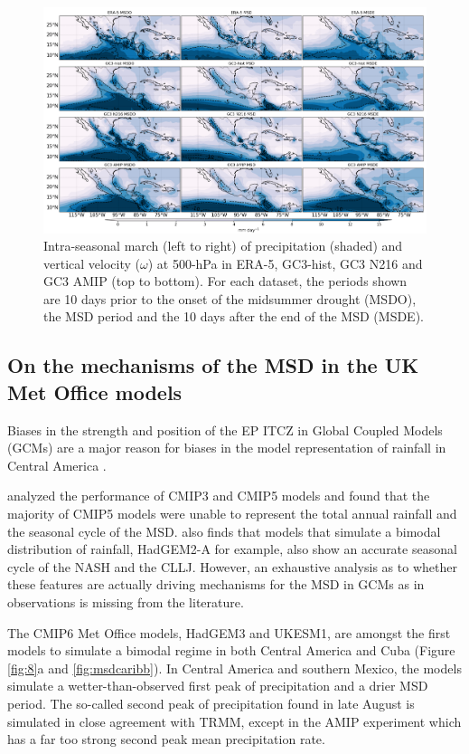   \begin{figure}[t!]
\includegraphics[width=\linewidth]{figures/modcompar_dif2pr3.png}
\caption{Intra-seasonal march (left to right) of precipitation (shaded) and vertical velocity ($\omega$) at 500-hPa in ERA-5, GC3-hist, GC3 N216 and GC3 AMIP (top to bottom). For each dataset, the periods shown are 10 days prior to the onset of the midsummer drought (MSDO), the MSD period and the 10 days after the end of the MSD (MSDE).}
\label{fig:eof2}
\end{figure}


\subsection{ On the mechanisms of the MSD in the UK Met Office models}
\label{sq:chap3}

Biases in the strength and position of the EP ITCZ in Global Coupled Models (GCMs) \citep{bellucci2010,li2014,schneider2014} are a major reason for biases in the model representation of rainfall in Central America  \citep{rauscher2008}. 

\cite{ryu2014} analyzed the performance of CMIP3 and CMIP5 models and found that the majority of CMIP5 models were unable to represent the total annual rainfall and the seasonal cycle of the MSD. \cite{ryu2014} also finds that models that simulate a bimodal distribution of rainfall, HadGEM2-A for example, also show an accurate seasonal cycle of the NASH and the CLLJ. However, an exhaustive analysis as to whether these features are actually driving mechanisms for the MSD in GCMs as in observations is missing from the literature. 


The CMIP6 Met Office models, HadGEM3 and UKESM1, are amongst the first models to simulate a bimodal regime in both Central America and Cuba (Figure \ref{fig:8}a and \ref{fig:msdcaribb}). 
In Central America and southern Mexico, the models simulate a wetter-than-observed first peak of precipitation and a drier MSD period.
% 
The so-called second peak of precipitation found in late August is simulated in close agreement with TRMM, except in the AMIP experiment which has a far too strong second peak mean precipitation rate.



